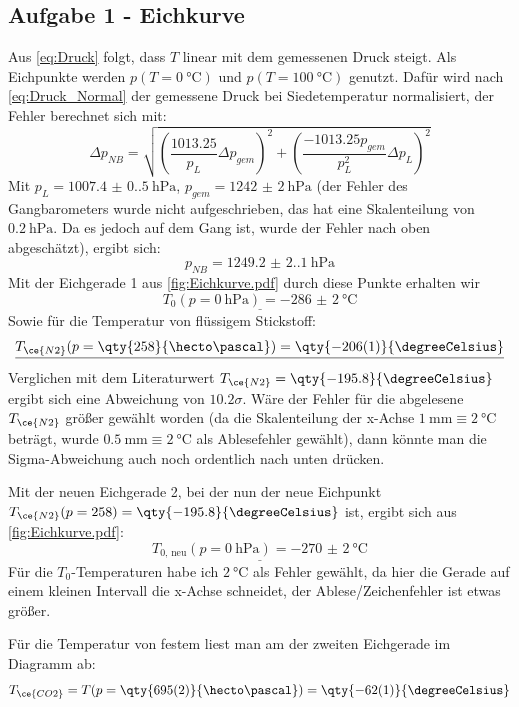 \subsection{Aufgabe 1 - Eichkurve}
Aus \cref{eq:Druck} folgt, dass \(T\) linear mit dem gemessenen Druck steigt. Als Eichpunkte werden \(p(T=\qty{0}{\degreeCelsius})\) und \(p(T=\qty{100}{\degreeCelsius})\) genutzt. Dafür wird nach \cref{eq:Druck_Normal} der gemessene Druck bei Siedetemperatur normalisiert, der Fehler berechnet sich mit:
\begin{equation}
   \Delta p_{NB}=\sqrt{\left(\frac{1013.25}{p_L} \Delta p_{gem}\right)^2+\left(\frac{-1013.25p_{gem}}{p_L^2} \Delta p_L\right)^2}
\end{equation}
Mit \(p_L=\qty{1007.4(0.5)}{\hecto\pascal}\), \(p_{gem}=\qty{1242(2)}{\hecto\pascal}\) (der Fehler des Gangbarometers wurde nicht aufgeschrieben, das hat eine Skalenteilung von \(\qty{0.2}{\hecto\pascal}\). Da es jedoch auf dem Gang ist, wurde der Fehler nach oben abgeschätzt), ergibt sich:
\[{p_{NB}=\qty{1249.2(2.1)}{\hecto\pascal}}\]
Mit der Eichgerade 1 aus \cref{fig:Eichkurve.pdf} durch diese Punkte erhalten wir \[\underline{T_0(p=\qty{0}{\hecto\pascal})=\qty{-286(2)}{\degreeCelsius}}\]
Sowie für die Temperatur von flüssigem Stickstoff:
\[\underline{T_{\ce{N2}}(p=\qty{258}{\hecto\pascal})=\qty{-206(1)}{\degreeCelsius}}\]
Verglichen mit dem Literaturwert \(T_{\ce{N2}}=\qty{-195.8}{\degreeCelsius}\) ergibt sich eine Abweichung von \(10.2\sigma\). Wäre der Fehler für die abgelesene \(T_{\ce{N2}}\) größer gewählt worden (da die Skalenteilung der x-Achse \(\qty{1}{\milli\meter}\equiv\qty{2}{\degreeCelsius}\) beträgt, wurde \(\qty{0.5}{\milli\meter}\equiv\qty{2}{\degreeCelsius}\) als Ablesefehler gewählt), dann könnte man die Sigma-Abweichung auch noch ordentlich nach unten drücken.  

Mit der neuen Eichgerade 2, bei der nun der neue Eichpunkt \(T_{\ce{N2}}(p=258)=\qty{-195.8}{\degreeCelsius}\) ist, ergibt sich aus \cref{fig:Eichkurve.pdf}:
\[\underline{T_{0,\,\text{neu}}(p=\qty{0}{\hecto\pascal})=\qty{-270(2)}{\degreeCelsius}}\]
Für die \(T_0\)-Temperaturen habe ich \(\qty{2}{\degreeCelsius}\) als Fehler gewählt, da hier die Gerade auf einem kleinen Intervall die x-Achse schneidet, der Ablese/Zeichenfehler ist etwas größer.

Für die Temperatur von festem  liest man am der zweiten Eichgerade im Diagramm ab:
\[T_{\ce{CO2}}=T(p=\qty{695(2)}{\hecto\pascal})=\qty{-62(1)}{\degreeCelsius}\]

\FloatBarrier
\clearpage

